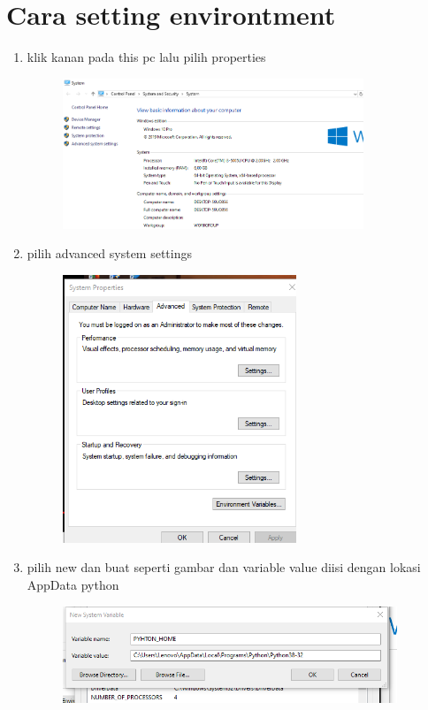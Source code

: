 \section*{Cara setting environtment}
 \begin{enumerate}
	\item klik kanan pada this pc lalu pilih properties
	\begin{figure} [h]
	\includegraphics[width=9cm]{section/picpyt/env/env1.png}
	\centering
	\end{figure}
	
	 
	\item pilih advanced system settings
	\begin{figure} [h]
	\includegraphics[width=7cm]{section/picpyt/env/env2.png}
	\centering
	\end{figure}
	
	\item pilih new dan buat seperti gambar dan variable value diisi dengan lokasi AppData python
	\begin{figure} [h]
	\includegraphics[width=10cm]{section/picpyt/env/env6.png}
	\centering
	\end{figure}
	

\end{enumerate}
